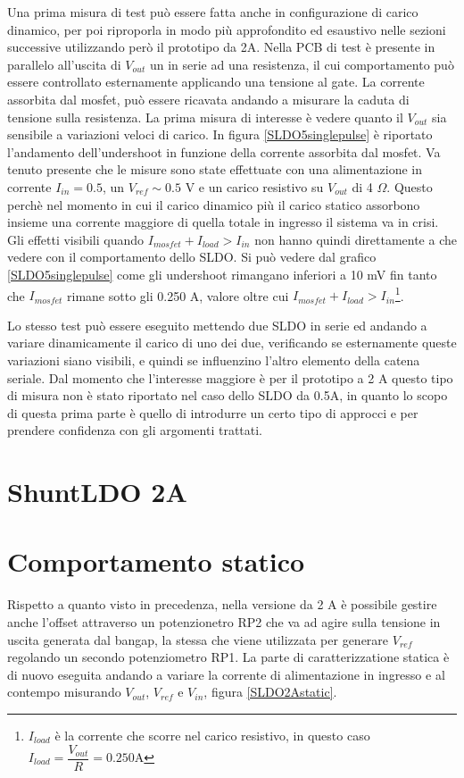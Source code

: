 Una prima misura di test può essere fatta anche in configurazione di carico dinamico, per poi riproporla in modo più approfondito ed esaustivo nelle sezioni successive utilizzando però il prototipo da 2A.
Nella PCB di test è presente in parallelo all'uscita di $V_{out}$ un in serie ad una resistenza, il cui comportamento può essere controllato esternamente applicando una tensione al gate. 
La corrente assorbita dal mosfet, può essere ricavata andando a misurare la caduta di tensione sulla resistenza. La prima misura di interesse è vedere quanto il $V_{out}$ sia sensibile a variazioni veloci di carico. In figura \ref{SLDO5singlepulse} è riportato l'andamento dell'undershoot in funzione della corrente assorbita dal mosfet. Va tenuto presente che le misure sono state effettuate con una alimentazione in corrente $I_{in} = 0.5$, un $V_{ref} \sim 0.5$ V e un carico resistivo su $V_{out}$ di 4 $\Omega$. Questo perchè nel momento in cui il carico dinamico più il carico statico assorbono insieme una corrente maggiore di quella totale in ingresso il sistema va in crisi. Gli effetti visibili quando $I_{mosfet} + I_{load} > I_{in}$ non hanno quindi direttamente a che vedere con il comportamento dello SLDO. Si può vedere dal grafico \ref{SLDO5singlepulse} come gli undershoot rimangano inferiori a 10 mV fin tanto che $I_{mosfet}$ rimane sotto gli 0.250 A, valore oltre cui $I_{mosfet} + I_{load} > I_{in}$\footnote{$I_{load}$ è la corrente che scorre nel carico resistivo, in questo caso $I_{load} = \dfrac{V_{out}}{R} = 0.250$A}. 

Lo stesso test può essere eseguito mettendo due SLDO in serie ed andando a variare dinamicamente il carico di uno dei due, verificando se esternamente queste variazioni siano visibili, e quindi se influenzino l'altro elemento della catena seriale. Dal momento che l'interesse maggiore è per il prototipo a 2 A questo tipo di misura non è stato riportato nel caso dello SLDO da 0.5A, in quanto lo scopo di questa prima parte è quello di introdurre un certo tipo di approcci e per prendere confidenza con gli argomenti trattati.

\section{ShuntLDO 2A}

\section{Comportamento statico}
Rispetto a quanto visto in precedenza, nella versione da 2 A è possibile gestire anche l'offset attraverso un potenzionetro RP2 che va ad agire sulla tensione in uscita generata dal bangap, la stessa che viene utilizzata per generare $V_{ref}$ regolando un secondo potenziometro RP1. La parte di caratterizzatione statica è di nuovo eseguita andando a variare la corrente di alimentazione in ingresso e al contempo misurando $V_{out}$, $V_{ref}$ e $V_{in}$, figura \ref{SLDO2Astatic}.

